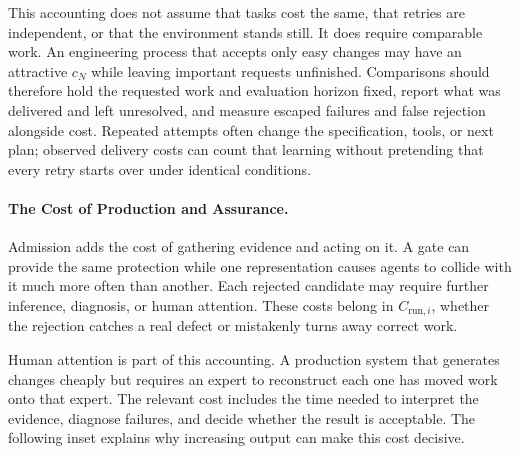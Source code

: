 
This accounting does not assume that tasks cost the same, that retries are independent, or that the environment stands still. It does require comparable work. An engineering process that accepts only easy changes may have an attractive \(c_N\) while leaving important requests unfinished. Comparisons should therefore hold the requested work and evaluation horizon fixed, report what was delivered and left unresolved, and measure escaped failures and false rejection alongside cost. Repeated attempts often change the specification, tools, or next plan; observed delivery costs can count that learning without pretending that every retry starts over under identical conditions.

\paragraph{The Cost of Production and Assurance.}


Admission adds the cost of gathering evidence and acting on it. A gate can provide the same protection while one representation causes agents to collide with it much more often than another. Each rejected candidate may require further inference, diagnosis, or human attention. These costs belong in \(C_{\text{run},i}\), whether the rejection catches a real defect or mistakenly turns away correct work.


Human attention is part of this accounting. A production system that generates changes cheaply but requires an expert to reconstruct each one has moved work onto that expert. The relevant cost includes the time needed to interpret the evidence, diagnose failures, and decide whether the result is acceptable. The following inset explains why increasing output can make this cost decisive.



